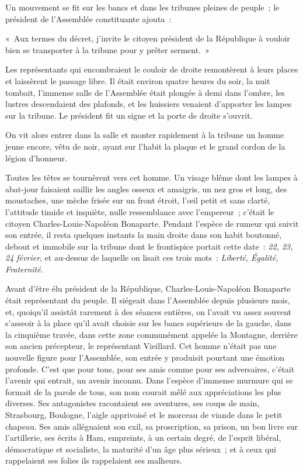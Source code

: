 \documentclass[french,twoside]{book} %
\newenvironment{quoteblock}%
  {\begin{quoting}}
  {\end{quoting}}
\newenvironment{quotebar}{%
    \def\FrameCommand{{\color{rubric!10!}\vrule width 0.5em} \hspace{0.9em}}%
    \def\OuterFrameSep{0pt} %
    \MakeFramed {\advance\hsize-\width \FrameRestore}
  }%
  {%
    \endMakeFramed
  }
\renewenvironment{quoteblock}%
  {%
    \savenotes
    \setstretch{0.9}
    \begin{quotebar}
    \smallskip
  }
  {%
    \smallskip
    \end{quotebar}
    \spewnotes
  }
\begin{document}
\noindent Un mouvement se fit sur les bancs et dans les tribunes pleines de peuple ; le président de l’Assemblée constituante ajouta :\par

\begin{quoteblock}
 \noindent « Aux termes du décret, j’invite le citoyen président de la République à vouloir bien se transporter à la tribune pour y prêter serment. »
 \end{quoteblock}

\noindent Les représentants qui encombraient le couloir de droite remontèrent à leurs places et laissèrent le passage libre. Il était environ quatre heures du soir, la nuit tombait, l’immense salle de l’Assemblée était plongée à demi dans l’ombre, les lustres descendaient des plafonds, et les huissiers venaient d’apporter les lampes sur la tribune. Le président fit un signe et la porte de droite s’ouvrit.\par
On vit alors entrer dans la salle et monter rapidement à la tribune un homme jeune encore, vêtu de noir, ayant sur l’habit la plaque et le grand cordon de la légion d’honneur.\par
Toutes les têtes se tournèrent vers cet homme. Un visage blême dont les lampes à abat-jour faisaient saillir les angles osseux et amaigris, un nez gros et long, des moustaches, une mèche frisée sur un front étroit, l’œil petit et sans clarté, l’attitude timide et inquiète, nulle ressemblance avec l’empereur ; c’était le citoyen Charles-Louis-Napoléon Bonaparte. Pendant l’espèce de rumeur qui suivit son entrée, il resta quelques instants la main droite dans son habit boutonné, debout et immobile sur la tribune dont le frontispice portait cette date : \emph{22, 23, 24 février}, et au-dessus de laquelle on lisait ces trois mots : \emph{Liberté, Égalité, Fraternité}.\par
Avant d’être élu président de la République, Charles-Louis-Napoléon Bonaparte était représentant du peuple. Il siégeait dans l’Assemblée depuis plusieurs mois, et, quoiqu’il assistât rarement à des séances entières, on l’avait vu assez souvent s’asseoir à la place qu’il avait choisie sur les bancs supérieurs de la gauche, dans la cinquième travée, dans cette zone communément appelée la Montagne, derrière son ancien précepteur, le représentant Vieillard. Cet homme n’était pas une nouvelle figure pour l’Assemblée, son entrée y produisit pourtant une émotion profonde. C’est que pour tous, pour ses amis comme pour ses adversaires, c’était l’avenir qui entrait, un avenir inconnu. Dans l’espèce d’immense murmure qui se formait de la parole de tous, son nom courait mêlé aux appréciations les plus diverses. Ses antagonistes racontaient ses aventures, ses coups de main, Strasbourg, Boulogne, l’aigle apprivoisé et le morceau de viande dans le petit chapeau. Ses amis alléguaient son exil, sa proscription, sa prison, un bon livre sur l’artillerie, ses écrits à Ham, empreints, à un certain degré, de l’esprit libéral, démocratique et socialiste, la maturité d’un âge plus sérieux ; et à ceux qui rappelaient ses folies ils rappelaient ses malheurs.\par
\end{document}

